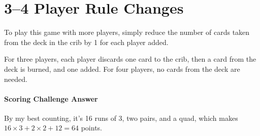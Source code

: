 \section{3--4 Player Rule Changes}
To play this game with more players, simply reduce the number of cards taken from the deck in the crib by 1 for each player added.

For three players, each player discards one card to the crib, then a card from the deck is burned, and one added. For four players, no cards from the deck are needed.

\paragraph{Scoring Challenge Answer}
By my best counting, it's 16 runs of 3, two pairs, and a quad, which makes $16 \times 3 + 2 \times 2 + 12 = 64$ points.